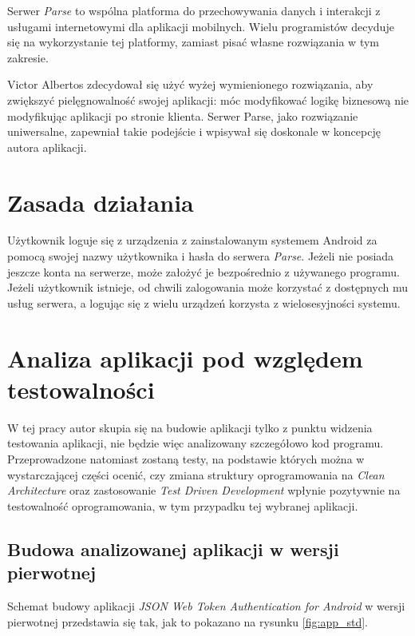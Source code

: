 Serwer \textit{Parse} to wspólna platforma do przechowywania danych i interakcji z usługami internetowymi dla aplikacji mobilnych. Wielu programistów decyduje się na wykorzystanie tej platformy, zamiast pisać własne rozwiązania w tym zakresie.

Victor Albertos zdecydował się użyć wyżej wymienionego rozwiązania, aby zwiększyć pielęgnowalność swojej aplikacji: móc modyfikować logikę biznesową nie modyfikując aplikacji po stronie klienta. Serwer Parse, jako rozwiązanie uniwersalne, zapewniał takie podejście i wpisywał się doskonale w koncepcję autora aplikacji.

\section{Zasada działania}
Użytkownik loguje się z urządzenia z zainstalowanym systemem Android za pomocą swojej nazwy użytkownika i hasła do serwera \textit{Parse}. Jeżeli nie posiada jeszcze konta na serwerze, może założyć je bezpośrednio z używanego programu. Jeżeli użytkownik istnieje, od chwili zalogowania może korzystać z dostępnych mu usług serwera, a logując się z wielu urządzeń korzysta z wielosesyjności systemu. 

\section{Analiza aplikacji pod względem testowalności}
W tej pracy autor skupia się na budowie aplikacji tylko z punktu widzenia testowania aplikacji, nie będzie więc analizowany szczegółowo kod programu. Przeprowadzone natomiast zostaną testy, na podstawie których można w wystarczającej części ocenić, czy zmiana struktury oprogramowania na \textit{Clean Architecture} oraz zastosowanie  \textit{Test Driven Development} wpłynie pozytywnie na testowalność oprogramowania, w tym przypadku tej wybranej aplikacji.

\newpage
\subsection{Budowa analizowanej aplikacji w wersji pierwotnej}
Schemat budowy aplikacji \textit{JSON Web Token Authentication for Android} w wersji pierwotnej przedstawia się tak, jak to pokazano na rysunku \ref{fig:app_std}.

